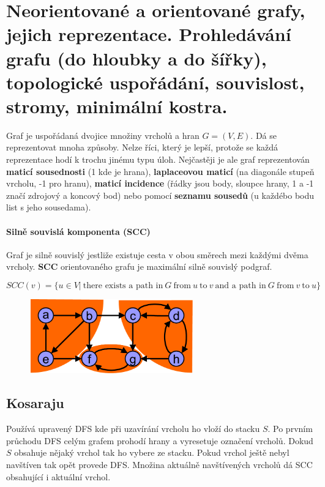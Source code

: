 \section[PAL - Grafy - refrezentace a algoritmy]{Neorientované a orientované grafy, jejich reprezentace. Prohledávání grafu (do hloubky a do šířky), topologické uspořádání, souvislost, stromy, minimální kostra.}
Graf je uspořádaná dvojice množiny vrcholů a hran $G = (V,E)$. Dá se reprezentovat mnoha způsoby. Nelze říci, který je lepší, protože se každá reprezentace hodí k trochu jinému typu úloh. Nejčastěji je ale graf reprezentován \textbf{maticí sousednosti} (1 kde je hrana), \textbf{laplaceovou maticí} (na diagonále stupeň vrcholu, -1 pro hranu), \textbf{maticí incidence} (řádky jsou body, sloupce hrany, 1 a -1 značí zdrojový a koncový bod) nebo pomocí \textbf{seznamu sousedů} (u každébo bodu list s jeho sousedama).

\paragraph{Silně souvislá komponenta (SCC)}
Graf je silně souvislý jestliže existuje cesta v obou směrech mezi každými dvěma vrcholy. \textbf{SCC} orientovaného grafu je maximální silně souvislý podgraf.

    $$SCC(v) = \{u \in V |~\text{there exists a path in}~G~\text{from}~u~\text{to}~v~\text{and a path in}~G~\text{from}~v~\text{to}~u\}$$
    
\begin{figure}[h]
    \begin{center}
        \includegraphics[width=70mm]{02/images/scc}
    \end{center}
\end{figure}

\subsection{Kosaraju}
Používá upravený DFS kde při uzavírání vrcholu ho vloží do stacku $S$. Po prvním průchodu DFS celým grafem prohodí hrany a vyresetuje označení vrcholů. Dokud $S$ obsahuje nějaký vrchol tak ho vybere ze stacku. Pokud vrchol ještě nebyl navštíven tak opět provede DFS. Množina aktuálně navštívených vrcholů dá SCC obsahující i aktuální vrchol.

